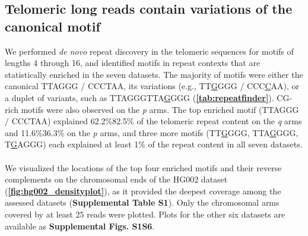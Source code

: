 \documentclass{article}
\begin{document}
\subsection*{Telomeric long reads contain variations of the canonical motif}
    We performed \textit{de novo} repeat discovery in the telomeric sequences for motifs of lengths 4 through 16,
            and identified motifs in repeat contexts that are statistically enriched in the seven datasets.
        The majority of motifs were either the canonical TTAGGG / CCCTAA,
            its variations (e.g., TT\underline{G}GGG / CCC\underline{C}AA),
            or a duplet of variants, such as TTAGGGTTA\underline{G}GGG
            (\textbf{\autoref{tab:repeatfinder}}).
        CG-rich motifs were also observed on the \textit{p} arms.
        The top enriched motif (TTAGGG / CCCTAA) explained
            62.2\%\textendash{}82.5\% of the telomeric repeat content on the \textit{q} arms
            and 11.6\%\textendash{}36.3\% on the \textit{p} arms,
            and three more motifs (TT\underline{G}GGG, TTA\underline{G}GGG, T\underline{G}AGGG)
                each explained at least 1\% of the repeat content in all seven datasets.
    \\~\\
    We visualized the locations of the top four enriched motifs and their reverse complements
        on the chromosomal ends of the HG002 dataset (\textbf{\autoref{fig:hg002_densityplot}}),
        as it provided the deepest coverage among the assessed datasets (\textbf{Supplemental Table S1}).
        Only the chromosomal arms covered by at least 25 reads were plotted.
            Plots for the other six datasets are available as \textbf{Supplemental Figs. S1\textendash{}S6}.
\end{document}
